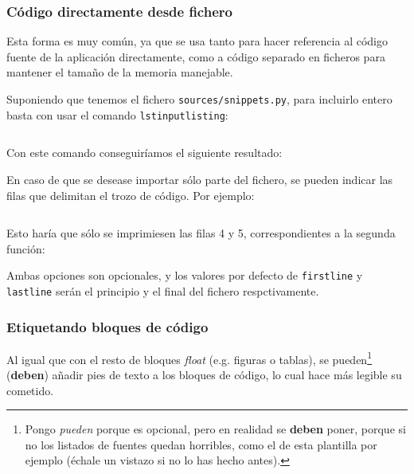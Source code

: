 \documentclass[%
    school=etsisi,%
    degree=61TI,%
]{upm-report}
\begin{document}


\subsubsection{Código directamente desde fichero}

Esta forma es muy común, ya que se usa tanto para hacer referencia al código fuente de la aplicación directamente, como a código separado en ficheros para mantener el tamaño de la memoria manejable.

Suponiendo que tenemos el fichero \texttt{sources/snippets.py}, para incluirlo entero basta con usar el comando \texttt{lstinputlisting}:

\begin{lstlisting}[language=TeX]

\end{lstlisting}

Con este comando conseguiríamos el siguiente resultado:



En caso de que se desease importar sólo parte del fichero, se pueden indicar las filas que delimitan el trozo de código. Por ejemplo:

\begin{lstlisting}[language=TeX]

\end{lstlisting}

Esto haría que sólo se imprimiesen las filas 4 y 5, correspondientes a la segunda función:



Ambas opciones son opcionales, y los valores por defecto de \texttt{firstline} y \texttt{lastline} serán el principio y el final del fichero respctivamente.

\subsubsection{Etiquetando bloques de código}

Al igual que con el resto de bloques \textit{float} (e.g. figuras o tablas), se pueden\footnote{Pongo \textit{pueden} porque es opcional, pero en realidad se \textbf{deben} poner, porque si no los listados de fuentes quedan horribles, como el de esta plantilla por ejemplo (échale un vistazo si no lo has hecho antes).} (\textbf{deben}) añadir pies de texto a los bloques de código, lo cual hace más legible su cometido.
\end{document}
